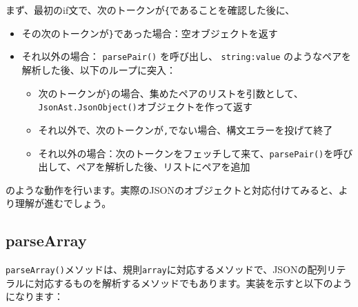 まず、最初のif文で、次のトークンが\texttt{\{}であることを確認した後に、

\begin{itemize}
\tightlist
\item
  その次のトークンが\texttt{\}}であった場合：空オブジェクトを返す
\item
  それ以外の場合： \texttt{parsePair()} を呼び出し、
  \texttt{string:value} のようなペアを解析した後、以下のループに突入：

  \begin{itemize}
  \tightlist
  \item
    次のトークンが\texttt{\}}の場合、集めたペアのリストを引数として、\texttt{JsonAst.JsonObject()}オブジェクトを作って返す
  \item
    それ以外で、次のトークンが\texttt{,}でない場合、構文エラーを投げて終了
  \item
    それ以外の場合：次のトークンをフェッチして来て、\texttt{parsePair()}を呼び出して、ペアを解析した後、リストにペアを追加
  \end{itemize}
\end{itemize}

のような動作を行います。実際のJSONのオブジェクトと対応付けてみると、より理解が進むでしょう。

\hypertarget{chapter3-parsearray}{%
\subsection{parseArray}\label{chapter3-parsearray}}

\texttt{parseArray()}メソッドは、規則\texttt{array}に対応するメソッドで、JSONの配列リテラルに対応するものを解析するメソッドでもあります。実装を示すと以下のようになります：

